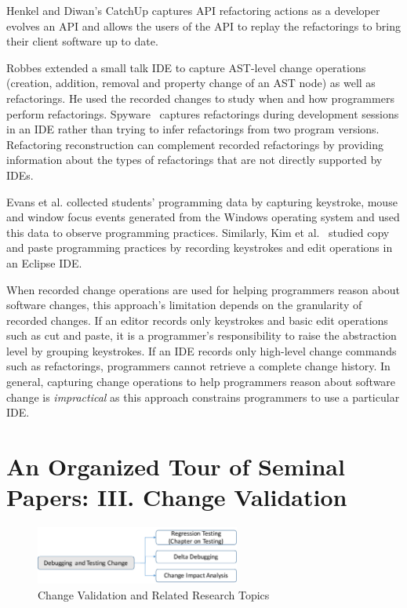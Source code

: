 \documentclass[runningheads,a4paper]{llncs}
\begin{document}
Henkel and Diwan's CatchUp \cite{Henkel2005} captures API refactoring actions as a developer evolves an API and allows the users of the API to replay the refactorings to bring their client software up to date. 

Robbes \cite{Robbes2007} extended a small talk IDE to capture AST-level change operations (creation, addition, removal and property change of an AST node) as well as refactorings. He used the recorded changes to study when and how programmers perform refactorings. Spyware~\cite{Robbes2008:spyware} captures refactorings during development sessions in an IDE rather than trying to infer refactorings from two program versions. Refactoring reconstruction can complement recorded refactorings by providing information about the types of refactorings that are not directly supported by IDEs.


Evans et al. \cite{Evans2003} collected students' programming data by capturing keystroke, mouse and window focus events generated from the Windows operating system and used this data to observe programming practices. Similarly, Kim et al.~\cite{Kim04} studied copy and paste programming practices by recording keystrokes and edit operations in an Eclipse IDE. 

When recorded change operations are used for helping programmers reason about software changes, this approach's limitation depends on the granularity of recorded changes. If an editor records only keystrokes and basic edit operations such as cut and paste, it is a programmer's responsibility to raise the abstraction level by grouping keystrokes. If an IDE records only high-level change commands such as refactorings, programmers cannot retrieve a complete change history. 
In general, capturing change operations to help programmers reason about software change is {\it impractical} as this approach constrains programmers to use a particular IDE. 


\section{An Organized Tour of Seminal Papers: III. Change Validation} 
\label{sec:debugtest}

\begin{figure}[ht]
 \centering
 \includegraphics[width=0.6\textwidth]{images/ChangeValidation.pdf} 
 \caption{Change Validation and Related Research Topics} 
 \label{fig:changevalidation} 
\end{figure}
\end{document}
